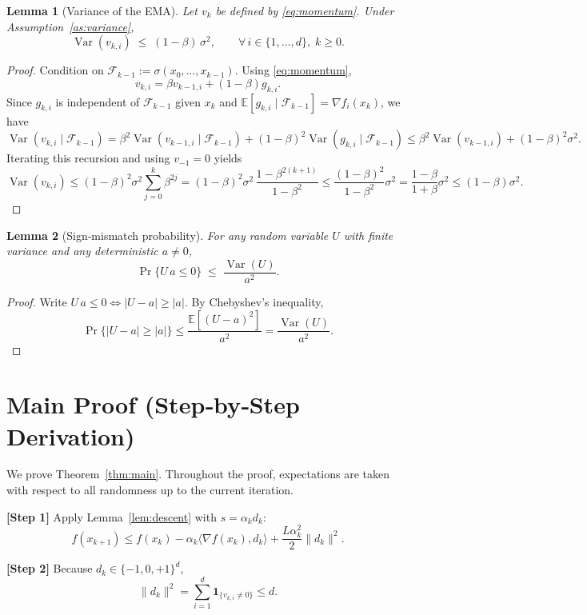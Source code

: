 \documentclass{article}
\newtheorem{lemma}{Lemma}
\newcommand{\E}{\mathbb{E}}
\begin{document}
\begin{lemma}[Variance of the EMA]\label{lem:varEMA}
Let $v_{k}$ be defined by \eqref{eq:momentum}.  Under Assumption~\ref{as:variance},
\[
\operatorname{Var}(v_{k,i})\;\le\;(1-\beta)\,\sigma^{2},\qquad\forall\,i\in\{1,\dots,d\},\;k\ge0 .
\]
\end{lemma}
\begin{proof}
Condition on $\mathcal{F}_{k-1}:=\sigma(x_{0},\dots,x_{k-1})$.  Using \eqref{eq:momentum},
\[
v_{k,i}= \beta v_{k-1,i} + (1-\beta)g_{k,i}.
\]
Since $g_{k,i}$ is independent of $\mathcal{F}_{k-1}$ given $x_{k}$ and $\E[g_{k,i}\mid\mathcal{F}_{k-1}]=\nabla f_{i}(x_{k})$, we have
\[
\operatorname{Var}(v_{k,i}\mid\mathcal{F}_{k-1})
 = \beta^{2}\operatorname{Var}(v_{k-1,i}\mid\mathcal{F}_{k-1})
   +(1-\beta)^{2}\operatorname{Var}(g_{k,i}\mid\mathcal{F}_{k-1})
 \le \beta^{2}\operatorname{Var}(v_{k-1,i})+(1-\beta)^{2}\sigma^{2}.
\]
Iterating this recursion and using $v_{-1}=0$ yields
\[
\operatorname{Var}(v_{k,i})\le (1-\beta)^{2}\sigma^{2}\sum_{j=0}^{k}\beta^{2j}
   = (1-\beta)^{2}\sigma^{2}\,\frac{1-\beta^{2(k+1)}}{1-\beta^{2}}
   \le \frac{(1-\beta)^{2}}{1-\beta^{2}}\sigma^{2}
   = \frac{1-\beta}{1+\beta}\sigma^{2}
   \le (1-\beta)\sigma^{2}.
\]
\end{proof}

\begin{lemma}[Sign‑mismatch probability]\label{lem:signprob}
For any random variable $U$ with finite variance and any deterministic $a\neq0$,
\[
\Pr\{U\,a\le0\}\;\le\;\frac{\operatorname{Var}(U)}{a^{2}} .
\]
\end{lemma}
\begin{proof}
Write $U\,a\le0\iff |U-a|\ge|a|$.  By Chebyshev’s inequality,
\[
\Pr\{|U-a|\ge|a|\}\le\frac{\E[(U-a)^{2}]}{a^{2}}
   =\frac{\operatorname{Var}(U)}{a^{2}} .
\]
\end{proof}

\section*{Main Proof (Step‑by‑Step Derivation)}
We prove Theorem~\ref{thm:main}.  Throughout the proof, expectations are taken with respect to all randomness up to the current iteration.

\noindent\textbf{[Step 1]} Apply Lemma~\ref{lem:descent} with $s=\alpha_{k}d_{k}$:
\[
f(x_{k+1})\le f(x_{k})-\alpha_{k}\langle \nabla f(x_{k}),d_{k}\rangle
               +\frac{L\alpha_{k}^{2}}{2}\|d_{k}\|^{2}.
\tag{1}
\]

\noindent\textbf{[Step 2]} Because $d_{k}\in\{-1,0,+1\}^{d}$,
\[
\|d_{k}\|^{2}= \sum_{i=1}^{d}\mathbf{1}_{\{v_{k,i}\neq0\}}\le d .
\tag{2}
\]
\end{document}
